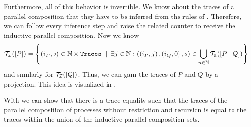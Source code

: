 Furthermore, all of this behavior is invertible. We know about the traces of a parallel composition that they have to be inferred from the rules of . Therefore, we can follow every inference step and raise the related counter to receive the inductive parallel composition. Now we know
\[\trI{P}=\set[\exists{}j\in\N:\left(\left(i_P,j\right),\left(i_Q,0\right),s\right)\in\bigcup_{n\in\N}\tracesI{n}{P}{Q}]{\left(i_P,s\right)\in\N\times\tr}\]
and similarly for $\mathcal{T_I}(\left[Q\right])$. Thus, we can gain the traces of $P$ and $Q$ by a projection. This idea is visualized in .



With  we can show that there is a trace equality such that the traces of the parallel composition of processes without restriction and recursion is equal to the traces within the union of the inductive parallel composition sets.

